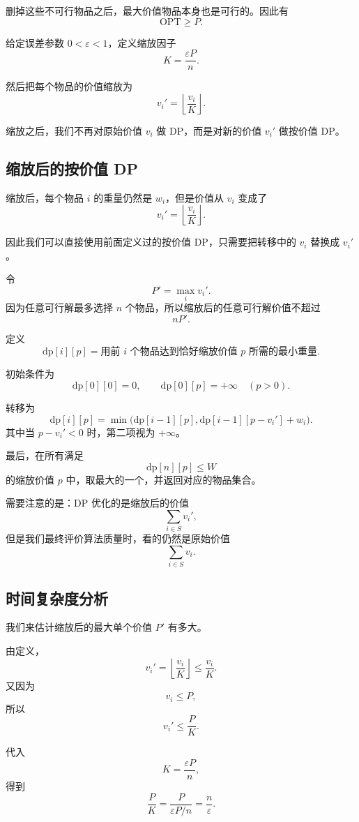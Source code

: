 \documentclass[UTF8,openany,12pt]{ctexbook}
\theoremstyle{remark}
\newcommand{\OPT}{\mathrm{OPT}}
\begin{document}
删掉这些不可行物品之后，最大价值物品本身也是可行的。因此有
\[
  \OPT\ge P.
\]

给定误差参数 $0<\varepsilon<1$，定义缩放因子
\[
  K=\frac{\varepsilon P}{n}.
\]

然后把每个物品的价值缩放为
\[
  v_i'
  =
  \left\lfloor \frac{v_i}{K}\right\rfloor.
\]

缩放之后，我们不再对原始价值 $v_i$ 做 DP，而是对新的价值 $v_i'$ 做按价值 DP。

\subsection{缩放后的按价值 DP}

缩放后，每个物品 $i$ 的重量仍然是 $w_i$，但是价值从 $v_i$ 变成了
\[
  v_i'=\left\lfloor \frac{v_i}{K}\right\rfloor.
\]

因此我们可以直接使用前面定义过的按价值 DP，只需要把转移中的 $v_i$ 替换成
$v_i'$。

令
\[
  P'=\max_i v_i'.
\]
因为任意可行解最多选择 $n$ 个物品，所以缩放后的任意可行解价值不超过
\[
  nP'.
\]

定义
\[
  \text{dp}[i][p]
  =
  \text{用前 } i \text{ 个物品达到恰好缩放价值 } p \text{ 所需的最小重量}.
\]

初始条件为
\[
  \text{dp}[0][0]=0,
  \qquad
  \text{dp}[0][p]=+\infty \quad (p>0).
\]

转移为
\[
  \text{dp}[i][p]
  =
  \min\bigl(
    \text{dp}[i-1][p],
    \text{dp}[i-1][p-v_i']+w_i
  \bigr).
\]
其中当 $p-v_i'<0$ 时，第二项视为 $+\infty$。

最后，在所有满足
\[
  \text{dp}[n][p]\le W
\]
的缩放价值 $p$ 中，取最大的一个，并返回对应的物品集合。

需要注意的是：DP 优化的是缩放后的价值
\[
  \sum_{i\in S} v_i',
\]
但是我们最终评价算法质量时，看的仍然是原始价值
\[
  \sum_{i\in S} v_i.
\]

\subsection{时间复杂度分析}

我们来估计缩放后的最大单个价值 $P'$ 有多大。

由定义，
\[
  v_i'
  =
  \left\lfloor \frac{v_i}{K}\right\rfloor
  \le
  \frac{v_i}{K}.
\]
又因为
\[
  v_i\le P,
\]
所以
\[
  v_i'
  \le
  \frac{P}{K}.
\]

代入
\[
  K=\frac{\varepsilon P}{n},
\]
得到
\[
  \frac{P}{K}
  =
  \frac{P}{\varepsilon P/n}
  =
  \frac{n}{\varepsilon}.
\]
\end{document}

